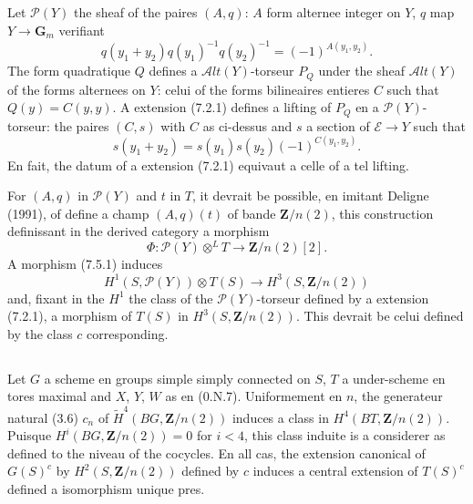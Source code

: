 \documentclass[11pt,a4paper]{article}
\theoremstyle{plain}
\theoremstyle{definition}
\begin{document}
\subsection{}\label{7.5}

Let $\mathscr{P}(Y)$ the sheaf of the paires $(A, q)$: $A$ form alternee integer on $Y$, $q$ map $Y \to \mathbf{G}_m$ verifiant
\[
q(y_1 + y_2) q(y_1)^{-1} q(y_2)^{-1} = (-1)^{A(y_1, y_2)}.
\]
The form quadratique $Q$ defines a $\mathscr{A}lt(Y)$-torseur $P_Q$ under the sheaf $\mathscr{A}lt(Y)$ of the forms alternees on $Y$: celui of the forms bilineaires entieres $C$ such that $Q(y) = C(y, y)$. A extension (7.2.1) defines a lifting of $P_Q$ en a $\mathscr{P}(Y)$-torseur: the paires $(C, s)$ with $C$ as ci-dessus and $s$ a section of $\mathscr{E} \to Y$ such that
\[
s(y_1 + y_2) = s(y_1) s(y_2) (-1)^{C(y_1, y_2)}.
\]
En fait, the datum of a extension (7.2.1) equivaut a celle of a tel lifting.

For $(A, q)$ in $\mathscr{P}(Y)$ and $t$ in $T$, it devrait be possible, en imitant Deligne (1991), of define a champ $(A, q)(t)$ of bande $\mathbf{Z}/n(2)$, this construction definissant in the derived category a morphism
\begin{equation}\label{7.5.1}
\Phi : \mathscr{P}(Y) \otimes^L T \to \mathbf{Z}/n(2)[2].
\end{equation}
A morphism (7.5.1) induces
\begin{equation}\label{7.5.2}
H^1(S, \mathscr{P}(Y)) \otimes T(S) \to H^3(S, \mathbf{Z}/n(2))
\end{equation}
and, fixant in the $H^1$ the class of the $\mathscr{P}(Y)$-torseur defined by a extension (7.2.1), a morphism of $T(S)$ in $H^3(S, \mathbf{Z}/n(2))$. This devrait be celui defined by the class $c$ corresponding.

\subsection{}\label{7.6}

Let $G$ a scheme en groups simple simply connected on $S$, $T$ a under-scheme en tores maximal and $X$, $Y$, $W$ as en (0.N.7). Uniformement en $n$, the generateur natural (3.6) $c_n$ of $\widetilde{H}^4(BG, \mathbf{Z}/n(2))$ induces a class in $H^4(BT, \mathbf{Z}/n(2))$. Puisque $H^i(BG, \mathbf{Z}/n(2)) = 0$ for $i < 4$, this class induite is a considerer as defined to the niveau of the cocycles. En all cas, the extension canonical of $G(S)^c$ by $H^2(S, \mathbf{Z}/n(2))$ defined by $c$ induces a central extension of $T(S)^c$ defined a isomorphism unique pres.
\end{document}
